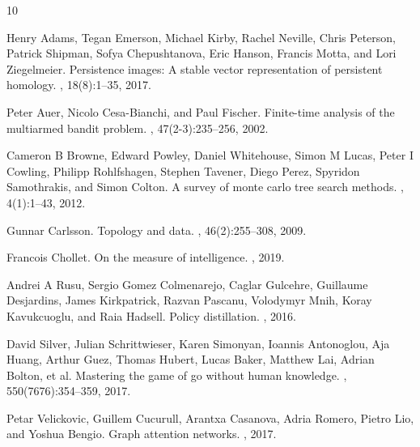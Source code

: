 \documentclass{article}
\begin{document}

\begin{thebibliography}{10}

Henry Adams, Tegan Emerson, Michael Kirby, Rachel Neville, Chris Peterson, Patrick Shipman, Sofya Chepushtanova, Eric Hanson, Francis Motta, and Lori Ziegelmeier.
\newblock Persistence images: A stable vector representation of persistent homology.
, 18(8):1--35, 2017.

Peter Auer, Nicolo Cesa-Bianchi, and Paul Fischer.
\newblock Finite-time analysis of the multiarmed bandit problem.
, 47(2-3):235--256, 2002.

Cameron B Browne, Edward Powley, Daniel Whitehouse, Simon M Lucas, Peter I Cowling, Philipp Rohlfshagen, Stephen Tavener, Diego Perez, Spyridon Samothrakis, and Simon Colton.
\newblock A survey of monte carlo tree search methods.
, 4(1):1--43, 2012.

Gunnar Carlsson.
\newblock Topology and data.
, 46(2):255--308, 2009.

Francois Chollet.
\newblock On the measure of intelligence.
, 2019.

Andrei A Rusu, Sergio Gomez Colmenarejo, Caglar Gulcehre, Guillaume Desjardins, James Kirkpatrick, Razvan Pascanu, Volodymyr Mnih, Koray Kavukcuoglu, and Raia Hadsell.
\newblock Policy distillation.
, 2016.

David Silver, Julian Schrittwieser, Karen Simonyan, Ioannis Antonoglou, Aja Huang, Arthur Guez, Thomas Hubert, Lucas Baker, Matthew Lai, Adrian Bolton, et al.
\newblock Mastering the game of go without human knowledge.
, 550(7676):354--359, 2017.

Petar Velickovic, Guillem Cucurull, Arantxa Casanova, Adria Romero, Pietro Lio, and Yoshua Bengio.
\newblock Graph attention networks.
, 2017.

\end{thebibliography}


\end{document}
